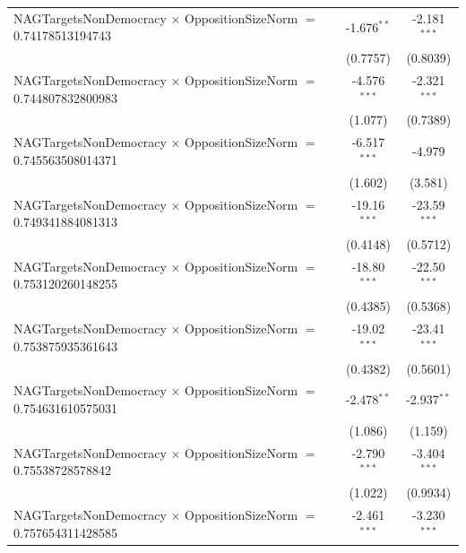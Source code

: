 \begin{tabular}{lcc}
   NAGTargetsNonDemocracy $\times$ OppositionSizeNorm $=$ 0.74178513194743      & -1.676$^{**}$        & -2.181$^{***}$\\   
                                                                                & (0.7757)             & (0.8039)\\   
   NAGTargetsNonDemocracy $\times$ OppositionSizeNorm $=$ 0.744807832800983     & -4.576$^{***}$       & -2.321$^{***}$\\   
                                                                                & (1.077)              & (0.7389)\\   
   NAGTargetsNonDemocracy $\times$ OppositionSizeNorm $=$ 0.745563508014371     & -6.517$^{***}$       & -4.979\\   
                                                                                & (1.602)              & (3.581)\\   
   NAGTargetsNonDemocracy $\times$ OppositionSizeNorm $=$ 0.749341884081313     & -19.16$^{***}$       & -23.59$^{***}$\\   
                                                                                & (0.4148)             & (0.5712)\\   
   NAGTargetsNonDemocracy $\times$ OppositionSizeNorm $=$ 0.753120260148255     & -18.80$^{***}$       & -22.50$^{***}$\\   
                                                                                & (0.4385)             & (0.5368)\\   
   NAGTargetsNonDemocracy $\times$ OppositionSizeNorm $=$ 0.753875935361643     & -19.02$^{***}$       & -23.41$^{***}$\\   
                                                                                & (0.4382)             & (0.5601)\\   
   NAGTargetsNonDemocracy $\times$ OppositionSizeNorm $=$ 0.754631610575031     & -2.478$^{**}$        & -2.937$^{**}$\\   
                                                                                & (1.086)              & (1.159)\\   
   NAGTargetsNonDemocracy $\times$ OppositionSizeNorm $=$ 0.75538728578842      & -2.790$^{***}$       & -3.404$^{***}$\\   
                                                                                & (1.022)              & (0.9934)\\   
   NAGTargetsNonDemocracy $\times$ OppositionSizeNorm $=$ 0.757654311428585     & -2.461$^{***}$       & -3.230$^{***}$\\   

\end{tabular}
